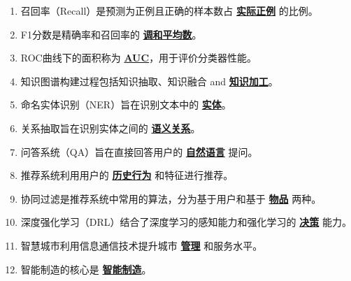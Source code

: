 \documentclass[12pt,a4paper,openany]{ctexbook}
\begin{document}
\begin{enumerate}[leftmargin=2em,itemsep=1pt]
\item 召回率（Recall）是预测为正例且正确的样本数占 \underline{\textbf{实际正例}} 的比例。
\item F1分数是精确率和召回率的 \underline{\textbf{调和平均数}}。
\item ROC曲线下的面积称为 \underline{\textbf{AUC}}，用于评价分类器性能。
\item 知识图谱构建过程包括知识抽取、知识融合 and \underline{\textbf{知识加工}}。
\item 命名实体识别（NER）旨在识别文本中的 \underline{\textbf{实体}}。
\item 关系抽取旨在识别实体之间的 \underline{\textbf{语义关系}}。
\item 问答系统（QA）旨在直接回答用户的 \underline{\textbf{自然语言}} 提问。
\item 推荐系统利用用户的 \underline{\textbf{历史行为}} 和特征进行推荐。
\item 协同过滤是推荐系统中常用的算法，分为基于用户和基于 \underline{\textbf{物品}} 两种。
\item 深度强化学习（DRL）结合了深度学习的感知能力和强化学习的 \underline{\textbf{决策}} 能力。
\item 智慧城市利用信息通信技术提升城市 \underline{\textbf{管理}} 和服务水平。
\item 智能制造的核心是 \underline{\textbf{智能制造}}。
\end{enumerate}
\end{document}
